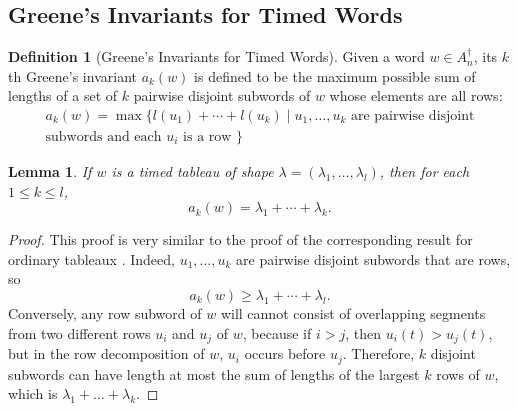 \documentclass[10pt]{amsproc}
\newtheorem{lemma}[theorem]{Lemma}
\theoremstyle{definition}
\newtheorem{definition}[theorem]{Definition}
\theoremstyle{remark}
\begin{document}
\subsection{Greene's Invariants for Timed Words}
\label{sec:timed-greene-invar}
\begin{definition}[Greene's Invariants for Timed Words]
  \label{definition:timed-Greene-invars}
  Given a word $w\in A_n^\dagger$, its $k$th Greene's invariant $a_k(w)$ is defined to be the maximum possible sum of lengths of a set of $k$ pairwise disjoint subwords of $w$ whose elements are all rows:
  \begin{multline*}
    a_k(w) = \max\{l(u_1)+\dotsb+l(u_k)\mid u_1,\dotsc,u_k \text{ are pairwise disjoint}\\ \text{subwords and each $u_i$ is a row }\}
  \end{multline*}
\end{definition}
\begin{lemma}
  \label{lemma:tableau-shape-greene}
  If $w$ is a timed tableau of shape $\lambda=(\lambda_1,\dotsc,\lambda_l)$, then for each $1\leq k\leq l$,
  \begin{displaymath}
    a_k(w) = \lambda_1+\dotsb + \lambda_k.
  \end{displaymath}
\end{lemma}
\begin{proof}
  This proof is very similar to the proof of the corresponding result for ordinary tableaux \cite{Greene-schen,Lascoux}.
  Indeed, $u_1,\dotsc,u_k$ are pairwise disjoint subwords that are rows, so
  \begin{displaymath}
    a_k(w) \geq \lambda_1+\dotsb + \lambda_l.
  \end{displaymath}
  Conversely, any row subword of $w$ will cannot consist of overlapping segments from two different rows $u_i$ and $u_j$ of $w$, because if $i>j$, then $u_i(t)>u_j(t)$, but in the row decomposition of $w$, $u_i$ occurs before $u_j$.
  Therefore, $k$ disjoint subwords can have length at most the sum of lengths of the largest $k$ rows of $w$, which is $\lambda_1+\dotsc+\lambda_k$.
\end{proof}
\end{document}
